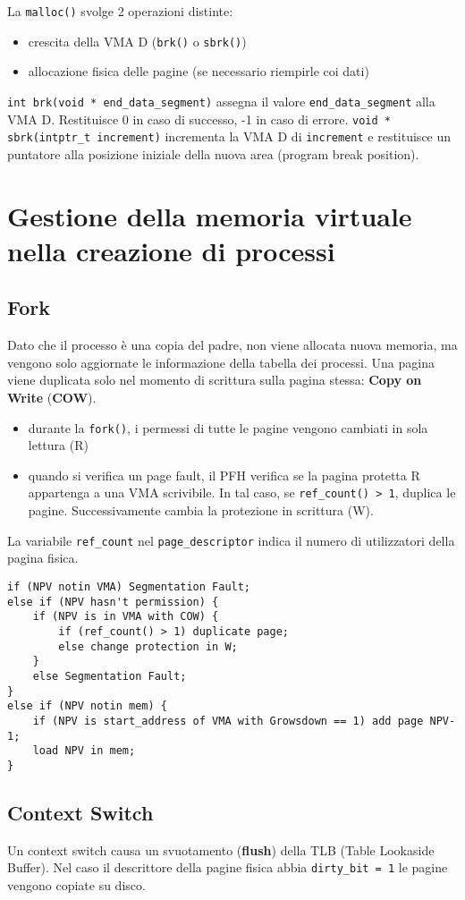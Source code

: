 \documentclass[12pt, a4paper]{report}
\begin{document}
La \texttt{malloc()} svolge 2 operazioni distinte:
\begin{itemize}
	\item crescita della VMA D (\texttt{brk()} o \texttt{sbrk()})
	\item allocazione fisica delle pagine (se necessario riempirle coi dati)
\end{itemize}
\texttt{int brk(void * end\_data\_segment)} assegna il valore
\texttt{end\_data\_segment} alla VMA D. Restituisce 0 in caso di successo, -1 in
caso di errore.
\texttt{void * sbrk(intptr\_t increment)} incrementa la VMA D di
\texttt{increment} e restituisce un puntatore alla posizione iniziale della
nuova area (program break position).

\section{Gestione della memoria virtuale nella creazione di processi}
\subsection{Fork}
Dato che il processo è una copia del padre, non viene allocata nuova memoria,
ma vengono solo aggiornate le informazione della tabella dei processi. Una pagina
viene duplicata solo nel momento di scrittura sulla pagina stessa: \textbf{Copy
on Write} (\textbf{COW}).
\begin{itemize}
	\item durante la \texttt{fork()}, i permessi di tutte le pagine vengono
		cambiati in sola lettura (R)
	\item quando si verifica un page fault, il PFH verifica se la pagina
		protetta R appartenga a una VMA scrivibile. In tal caso, se
		\texttt{ref\_count() > 1}, duplica le pagine. Successivamente cambia la
		protezione in scrittura (W).
\end{itemize}
La variabile \texttt{ref\_count} nel \texttt{page\_descriptor} indica il numero di
utilizzatori della pagina fisica.
\begin{verbatim}
if (NPV notin VMA) Segmentation Fault;
else if (NPV hasn't permission) {
    if (NPV is in VMA with COW) {
        if (ref_count() > 1) duplicate page;
        else change protection in W;
    }
    else Segmentation Fault;
}
else if (NPV notin mem) {
    if (NPV is start_address of VMA with Growsdown == 1) add page NPV-1;
    load NPV in mem;
}
\end{verbatim}
\subsection{Context Switch}
Un context switch causa un svuotamento (\textbf{flush}) della TLB (Table
Lookaside Buffer). Nel caso il descrittore della pagine fisica abbia
\texttt{dirty\_bit = 1} le pagine vengono copiate su disco.
\end{document}

